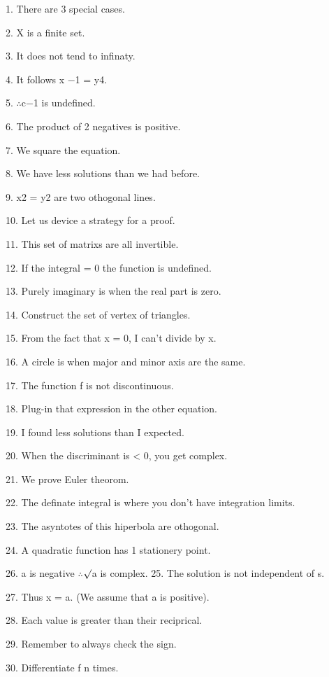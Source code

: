\documentclass[11pt]{article}
\theoremstyle{plain}
\theoremstyle{definition}
\begin{document}
1. There are 3 special cases.

2. X is a finite set.

3. It does not tend to infinaty.

4. It follows x $-$1 = y4.

5. $\therefore$c$-$1 is undefined.

6. The product of 2 negatives is positive.

7. We square the equation.

8. We have less solutions than we had before.

9. x2 = y2 are two othogonal lines.

10. Let us device a strategy for a proof.

11. This set of matrixs are all invertible.

12. If the integral = 0 the function is undefined.

13. Purely imaginary is when the real part is zero.

14. Construct the set of vertex of triangles.

15. From the fact that x = 0, I can't divide by x.

16. A circle is when major and minor axis are the same.

17. The function f is not discontinuous.

18. Plug-in that expression in the other equation.

19. I found less solutions than I expected.

20. When the discriminant is < 0, you get complex.

21. We prove Euler theorom.

22. The definate integral is where you don't have integration limits.

23. The asyntotes of this hiperbola are othogonal.

24. A quadratic function has 1 stationery point.

26. a is negative $\therefore$$\surd$a is complex. 25. The solution is not independent of s.

27. Thus x = a. (We assume that a is positive).

28. Each value is greater than their reciprical.

29. Remember to always check the sign.

30. Differentiate f n times.
\end{document}
